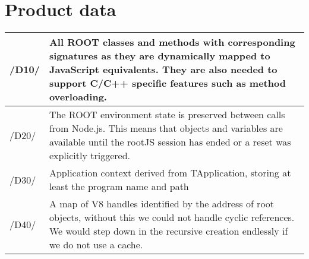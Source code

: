 \chapter{Product data}

\begin{longtable}{|p{1cm} | p{15cm}|}
\hline
/D10/ & All ROOT classes and methods with corresponding signatures as they are dynamically mapped to JavaScript equivalents. They are also needed to support C/C++ specific features such as method overloading.\\
\hline
/D20/ & The ROOT environment state is preserved between calls from Node.js. This means that objects and variables are available until the rootJS session has ended or a reset was explicitly triggered.\\
\hline
/D30/ & Application context derived from TApplication, storing at least the program name and path\\
\hline
/D40/ & A map of V8 handles identified by the address of root objects, without this we could not handle cyclic references. We would step down in the recursive creation endlessly if we do not use a cache.\\
\hline
\end{longtable}
